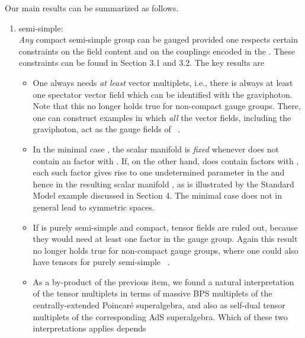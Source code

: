 \documentclass[a4paper,11pt]{article}
\providecommand{\ti}{\ensuremath{\tilde{I}}}
\providecommand{\tj}{\ensuremath{\tilde{J}}}
\providecommand{\tk}{\ensuremath{\tilde{K}}}
\providecommand{\M}{\ensuremath{\mathcal{M}}}
\begin{document}
Our main results can be summarized as follows.
\begin{enumerate}
\item {}\coordHE{} semi-simple:\\
\emph{Any} compact semi-simple group \coordHE{} can be gauged provided one 
respects certain constraints on the field content and on the 
couplings encoded in the \myHighlight{$C_{\ti\tj\tk}$}\coordHE{}. These constraints can be
found in Section 3.1 and 3.2. The key results are
\begin{itemize}
\item One always needs \emph{at least} \coordHE{} vector multiplets,
i.e., there is always at least one spectator vector field which can be 
identified with the graviphoton. Note that this no longer holds true
for non-compact gauge groups. There, one can construct examples in which
\emph{all} the vector fields, including the graviphoton, act as the
gauge fields of \coordHE{}~\cite{GST2}. 
\item In the minimal case \coordHE{}, the scalar manifold \myHighlight{$\M_{VS}$}\coordHE{} 
is \emph{fixed} whenever \coordHE{} does not contain an \coordHE{} factor with 
\coordHE{}. If, on the other hand, 
\coordHE{} does contain \coordHE{} factors with \coordHE{}, each such
\coordHE{} factor gives rise to one  undetermined parameter
in the \myHighlight{$C_{\ti\tj\tk}$}\coordHE{} and hence in the resulting scalar manifold
\myHighlight{$\M_{VS}$}\coordHE{}, as is illustrated by the Standard Model example discussed
in Section 4. The minimal case \coordHE{} 
does not in general lead to symmetric spaces.
\item If \coordHE{} is purely semi-simple and compact, tensor fields are ruled out,
because they would need at least one \coordHE{} factor in the gauge group.
Again this result no longer holds true for non-compact gauge groups,
where one could also have tensors for purely semi-simple
\coordHE{}~\cite{GST2,GZ1}.
\item As a by-product of the previous item, we found a natural 
interpretation of the tensor multiplets in terms of massive BPS multiplets of the 
centrally-extended Poincar\'{e} superalgebra, and also as self-dual tensor multiplets of 
the corresponding AdS superalgebra. Which of these two interpretations applies depends 

\end{itemize}
\end{enumerate}
\end{document}
